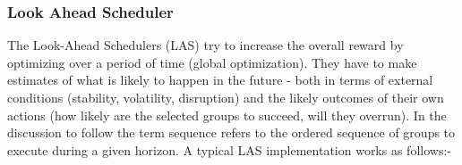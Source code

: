 
\subsubsection{Look Ahead Scheduler}
\label{ss:sched_qlas}


\newcommand{\echelon}{sequence }
\newcommand{\echelons}{sequences }

The Look-Ahead Schedulers (LAS) try to increase the overall reward by optimizing over a period of time (global optimization). They have to make estimates of what is likely to happen in the future - both in terms of external conditions (stability, volatility, disruption) and the likely outcomes of their own actions (how likely are the selected groups to succeed, will they overrun). In the discussion to follow the term \echelon refers to the ordered sequence of groups to execute during a given horizon. A typical LAS implementation works as follows:-

